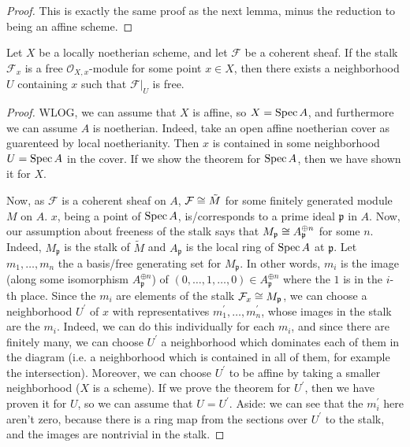 \begin{proof}
	This is exactly the same proof
	as the next lemma, minus the reduction
	to being an affine scheme.
\end{proof}


\begin{thm}
	Let \(X\) be a locally noetherian scheme, and let
	\(\mathcal{F}\) be a coherent sheaf. 
	If the stalk \(\mathcal{F}_{x}\) is a free
	\(\mathcal{O}_{X,x} \)-module for some point
	\(x \in X\), then there exists
	a neighborhood \(U\) containing \(x\) such that
	\(\mathcal{F}|_{U}\) is free.
\end{thm}

\begin{proof}
	WLOG, we can assume that \(X\) is affine, so 
	\(X = \operatorname{Spec} A\), and furthermore we can assume
	\(A\) is noetherian.
	Indeed, take an open affine noetherian cover 
	as guarenteed by local noetherianity. 
	Then \(x\) is contained in some neighborhood
	\(U = \operatorname{Spec} A\) in the cover. 
	If we show the theorem for \(\operatorname{Spec} A\),
	then we have shown it for \(X\).

	Now, as \(\mathcal{F}\) is a coherent sheaf on 
	\(A\), \(\mathcal{F} \cong \tilde{M}\) for some
	finitely generated module \(M\) on \(A\).
	\(x\), being a point of \(\operatorname{Spec} A\), 
	is/corresponds to a prime
	ideal \(\mathfrak{p}\) in \(A\).
	Now, our assumption about
	freeness of the stalk says that
	\(M_{\mathfrak{p}} \cong A_{\mathfrak{p}}^{\oplus n}\) 
	for some \(n\).
	Indeed, \(M_{\mathfrak{p}}\) is the stalk of 
	\(\tilde{M}\) and \(A_{\mathfrak{p}}\) is the local
	ring of \(\operatorname{Spec} A\) at \(\mathfrak{p}\).
	Let \(m_{1} , \ldots , m_{n}\) the a 
	basis/free generating set for \(M_{\mathfrak{p}}\).
	In other words, \(m_{i}\) is the image 
	(along
	some isomorphism \(A_{\mathfrak{p}}^{\oplus n}\)) of
	\((0, \ldots, 1, \ldots, 0) \in A_{\mathfrak{p}}^{\oplus n}\)
	where the \(1\) is in the \(i\)-th place.
	Since the \(m_{i}\) are elements of the stalk 
	\(\mathcal{F}_{x} \cong M_{\mathfrak{p}}\),
	we can choose a neighborhood \(U^{\prime}\) of \(x\) with 
	representatives \(m_{1}^{\prime}, \ldots, m_{n}^{\prime}\),
	whose images in the stalk are the \(m_{i}\).
	Indeed, we can do this individually for each \(m_{i}\),
	and since there are finitely many, 
	we can choose \(U^{\prime}\) a neighborhood which dominates each of them in 
	the diagram (i.e. a neighborhood which is contained in
	all of them, for example the intersection).
	Moreover, we can choose \(U^{\prime}\) to be affine by taking a 
	smaller neighborhood (\(X\) is a scheme).
	If we prove the theorem for \(U^{\prime}\), then we 
	have proven it for \(U\),
	so we can assume that \(U = U^{\prime}\).
	Aside: we can see that the \(m_{i}^{\prime}\) here aren't
	zero, because there is a ring map from the sections over
	\(U^{\prime}\) to the stalk, and the images are nontrivial in the stalk.



\end{proof}
